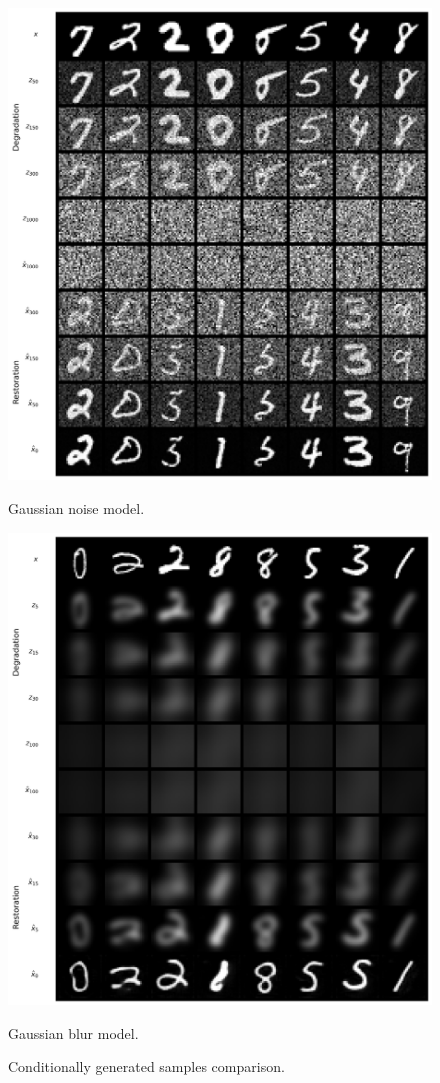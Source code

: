 \documentclass[11pt]{article}
\begin{document}
\begin{figure}[ht]
    \centering
    \begin{minipage}{.4\textwidth}
        \centering
        \includegraphics[width=0.9\linewidth]{figs/q2c_ddpm_cond_samples_norm_8.png}
        \caption{Gaussian noise model.}
        \label{fig:cond_ddpm}
    \end{minipage}
    \begin{minipage}{.4\textwidth}
        \centering
        \includegraphics[width=0.9\linewidth]{figs/q2c_blur_cond_samples_norm_8.png}
        \caption{Gaussian blur model.}
        \label{fig:cond_blur}
    \end{minipage}
    \caption{Conditionally generated samples comparison.}
    \label{fig:q2c_conditional_samples}
\end{figure}
\end{document}
